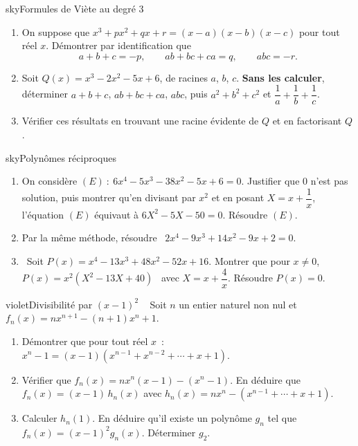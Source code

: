 \begin{exo}{sky}{Formules de Viète au degré 3 \demo\ }
\begin{enumerate}
  \item On suppose que $x^3+px^2+qx+r=(x-a)(x-b)(x-c)$ pour tout réel $x$. Démontrer par identification que
  \[ a+b+c=-p,\qquad ab+bc+ca=q,\qquad abc=-r. \]
  \item Soit $Q(x)=x^3-2x^2-5x+6$, de racines $a$, $b$, $c$. \textbf{Sans les calculer}, déterminer $a+b+c$, $ab+bc+ca$, $abc$, puis $a^2+b^2+c^2$ et $\dfrac1a+\dfrac1b+\dfrac1c$.
  \item Vérifier ces résultats en trouvant une racine évidente de $Q$ et en factorisant $Q$.
\end{enumerate}
\end{exo}

\begin{exo}{sky}{Polynômes réciproques }
\begin{enumerate}
  \item On considère $(E)~:\ 6x^4-5x^3-38x^2-5x+6=0$. Justifier que $0$ n'est pas solution, puis montrer qu'en divisant par $x^2$ et en posant $X=x+\dfrac1x$, l'équation $(E)$ équivaut à $6X^2-5X-50=0$. Résoudre $(E)$.
  \item Par la même méthode, résoudre \ $2x^4-9x^3+14x^2-9x+2=0$.
  \item \demo\ Soit $P(x)=x^4-13x^3+48x^2-52x+16$. Montrer que pour $x\neq0$, \ $P(x)=x^2\left(X^2-13X+40\right)$ \ avec $X=x+\dfrac4x$. Résoudre $P(x)=0$.
\end{enumerate}
\end{exo}


\begin{exo}{violet}{Divisibilité par $(x-1)^2$ \demo\ }
Soit $n$ un entier naturel non nul et \ $f_n(x)=nx^{n+1}-(n+1)x^n+1$.
\begin{enumerate}
  \item Démontrer que pour tout réel $x$~: \ $x^n-1=(x-1)\left(x^{n-1}+x^{n-2}+\cdots+x+1\right)$.
  \item Vérifier que $f_n(x)=nx^n(x-1)-(x^n-1)$. En déduire que $f_n(x)=(x-1)\,h_n(x)$ avec $h_n(x)=nx^n-\left(x^{n-1}+\cdots+x+1\right)$.
  \item Calculer $h_n(1)$. En déduire qu'il existe un polynôme $g_n$ tel que $f_n(x)=(x-1)^2g_n(x)$. Déterminer $g_2$.
\end{enumerate}
\end{exo}

